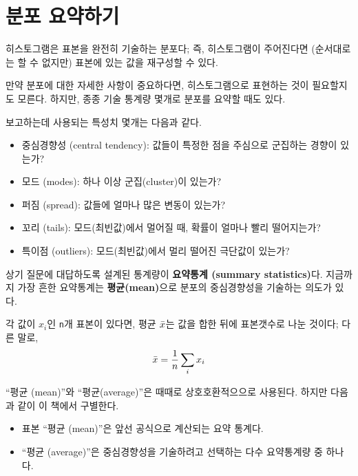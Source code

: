 \section{분포 요약하기}
\label{mean}

히스토그램은 표본을 완전히 기술하는 분포다; 즉, 히스토그램이 주어진다면 (순서대로는 할 수 없지만) 표본에 있는 값을 재구성할 수 있다.

만약 분포에 대한 자세한 사항이 중요하다면, 히스토그램으로 표현하는 것이 필요할지도 모른다.
하지만, 종종 기술 통계량 몇개로 분포를 요약할 때도 있다.

보고하는데 사용되는 특성치 몇개는 다음과 같다.

\begin{itemize}

\item 중심경향성 (central tendency): 
값들이 특정한 점을 주심으로 군집하는 경향이 있는가?

\item 모드 (modes): 하나 이상 군집(cluster)이 있는가?

\item 퍼짐 (spread): 값들에 얼마나 많은 변동이 있는가?

\item 꼬리 (tails): 모드(최빈값)에서 멀어질 때, 확률이 얼마나 빨리 떨어지는가?

\item 특이점 (outliers): 모드(최빈값)에서 멀리 떨어진 극단값이 있는가?

\end{itemize}

상기 질문에 대답하도록 설계된 통계량이 {\bf 요약통계 (summary statistics)}다.
지금까지 가장 흔한 요약통계는  {\bf 평균(mean)}으로 분포의 중심경향성을 기술하는 의도가 있다.

각 값이 $x_i$인 {\tt n}개 표본이 있다면, 평균 $\bar{x}$는 값을 합한 뒤에 표본갯수로 나눈 것이다;
다른 말로, 
%
\[ \bar{x} = \frac{1}{n} \sum_i x_i \]
%

``평균 (mean)''와 ``평균(average)''은 때때로 상호호환적으으로 사용된다. 하지만 다음과 같이 이 책에서 구별한다.


\begin{itemize}

\item 표본 ``평균 (mean)''은 앞선 공식으로 계산되는 요약 통계다.

\item ``평균 (average)''은 중심경향성을 기술하려고 선택하는 다수 요약통계량 중 하나다.

\end{itemize}

